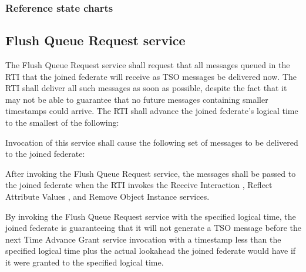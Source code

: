 \begin{compactstdpage}


    \subsubsection{Reference state charts}


    \subsection{Flush Queue Request service}

    The Flush Queue Request service shall request that all messages queued in the RTI that the joined federate will receive as TSO messages be delivered now. The RTI shall deliver all such messages as soon as possible, despite the fact that it may not be able to guarantee that no future messages containing smaller timestamps could arrive. The RTI shall advance the joined federate's logical time to the smallest of the following:


    Invocation of this service shall cause the following set of messages to be delivered to the joined federate:


    After invoking the Flush Queue Request service, the messages shall be passed to the joined federate when the RTI invokes the Receive Interaction \rtiinitiated{}, Reflect Attribute Values \rtiinitiated{}, and Remove Object Instance \rtiinitiated{} services.

    By invoking the Flush Queue Request service with the specified logical time, the joined federate is guaranteeing that it will not generate a TSO message before the next Time Advance Grant \rtiinitiated{} service invocation with a timestamp less than the specified logical time plus the actual lookahead the joined federate would have if it were granted to the specified logical time.


\end{compactstdpage}
